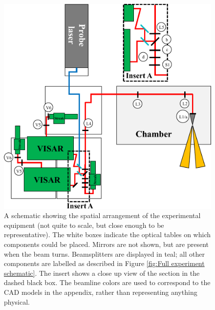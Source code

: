 \begin{figure}
\includegraphics[width=1.0\textwidth]{figures/Experiment/OriginalSetup.pdf}%
\caption{\label{fig:Original CAD} A schematic showing the spatial arrangement of the experimental equipment (not quite to scale, but close enough to be representative). The white boxes indicate the optical tables on which components could be placed. Mirrors are not shown, but are present when the beam turns. Beamsplitters are displayed in teal; all other components are labelled as described in Figure \ref{fig:Full experiment schematic}. The insert shows a close up view of the section in the dashed black box. The beamline colors are used to correspond to the CAD models in the appendix, rather than representing anything physical.}
\end{figure}


